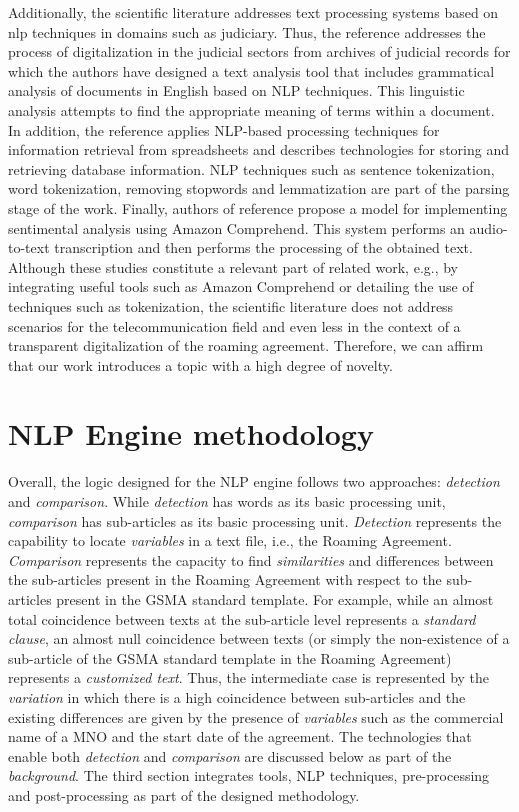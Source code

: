 \documentclass[conference]{style/IEEEtran}
\begin{document}
Additionally, the scientific literature addresses text processing systems based on nlp techniques in domains such as judiciary. Thus, the reference \cite{8487847} addresses the process of digitalization in the judicial sectors from archives of judicial records for which the authors have designed a text analysis tool that includes grammatical analysis of documents in English based on NLP techniques. This linguistic analysis attempts to find the appropriate meaning of terms within a document. In addition, the reference \cite{9138070} applies NLP-based processing techniques for information retrieval from spreadsheets and describes technologies for storing and retrieving database information. NLP techniques such as sentence tokenization, word tokenization, removing stopwords and lemmatization are part of the parsing stage of the work. Finally, authors of reference \cite{9104105} propose a model for implementing sentimental analysis using Amazon Comprehend. This system performs an audio-to-text transcription and then performs the processing of the obtained text. Although these studies  constitute a relevant part of related work, e.g., by integrating useful tools such as Amazon Comprehend or detailing the use of techniques such as tokenization, the scientific literature does not address scenarios for the telecommunication field and even less in the context of a transparent digitalization of the roaming agreement. Therefore, we can affirm that our work introduces a topic with a high degree of novelty.

\section{NLP Engine methodology}
Overall, the logic designed for the NLP engine follows two approaches: \textit{detection} and \textit{comparison}. While \textit{detection} has words as its basic processing unit, \textit{comparison} has sub-articles as its basic processing unit. \textit{Detection} represents the capability to locate \textit{variables} in a text file, i.e., the Roaming Agreement. \textit{Comparison} represents the capacity to find \textit{similarities} and differences between the sub-articles present in the Roaming Agreement with respect to the sub-articles present in the GSMA standard template. For example, while an almost total coincidence between texts at the sub-article level represents a \textit{standard clause}, an almost null coincidence between texts (or simply the non-existence of a sub-article of the GSMA standard template in the Roaming Agreement) represents a \textit{customized text}. Thus, the intermediate case is represented by the \textit{variation} in which there is a high coincidence between sub-articles and the existing differences are given by the presence of \textit{variables} such as the commercial name of a MNO and the start date of the agreement. The technologies that enable both \textit{detection} and \textit{comparison} are discussed below as part of the \textit{background}. The third section integrates tools, NLP techniques, pre-processing and post-processing as part of the designed methodology.
\end{document}
